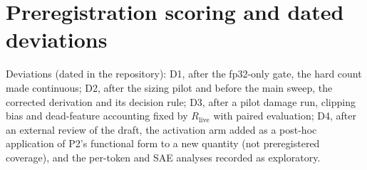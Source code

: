 \documentclass{article}
\begin{document}
\section{Preregistration scoring and dated deviations}
\label{app:score}
\label{app:deviations}
\begin{center}\small
{}
\end{center}
Deviations (dated in the repository): D1, after the fp32-only gate, the hard count made continuous; D2, after the sizing
pilot and before the main sweep, the corrected derivation and its decision rule; D3, after a pilot damage run, clipping
bias and dead-feature accounting fixed by $R_{\mathrm{live}}$ with paired evaluation; D4, after an external review of the
draft, the activation arm added as a post-hoc application of P2's functional form to a new quantity (not preregistered
coverage), and the per-token and SAE analyses recorded as exploratory.
\end{document}
